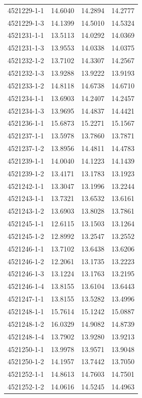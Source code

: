 \begin{longtable}{lrrr}
4521229-1-1 & 14.6040 & 14.2894 & 14.2777 \\
4521229-1-3 & 14.1399 & 14.5010 & 14.5324 \\
4521231-1-1 & 13.5113 & 14.0292 & 14.0369 \\
4521231-1-3 & 13.9553 & 14.0338 & 14.0375 \\
4521232-1-2 & 13.7102 & 14.3307 & 14.2567 \\
4521232-1-3 & 13.9288 & 13.9222 & 13.9193 \\
4521233-1-2 & 14.8118 & 14.6738 & 14.6710 \\
4521234-1-1 & 13.6903 & 14.2407 & 14.2457 \\
4521234-1-3 & 13.9695 & 14.4837 & 14.4421 \\
4521236-1-1 & 15.6873 & 15.2271 & 15.1567 \\
4521237-1-1 & 13.5978 & 13.7860 & 13.7871 \\
4521237-1-2 & 13.8956 & 14.4811 & 14.4783 \\
4521239-1-1 & 14.0040 & 14.1223 & 14.1439 \\
4521239-1-2 & 13.4171 & 13.1783 & 13.1923 \\
4521242-1-1 & 13.3047 & 13.1996 & 13.2244 \\
4521243-1-1 & 13.7321 & 13.6532 & 13.6161 \\
4521243-1-2 & 13.6903 & 13.8028 & 13.7861 \\
4521245-1-1 & 12.6115 & 13.1503 & 13.1264 \\
4521245-1-2 & 12.8992 & 13.2547 & 13.2552 \\
4521246-1-1 & 13.7102 & 13.6438 & 13.6206 \\
4521246-1-2 & 12.2061 & 13.1735 & 13.2223 \\
4521246-1-3 & 13.1224 & 13.1763 & 13.2195 \\
4521246-1-4 & 13.8155 & 13.6104 & 13.6443 \\
4521247-1-1 & 13.8155 & 13.5282 & 13.4996 \\
4521248-1-1 & 15.7614 & 15.1242 & 15.0887 \\
4521248-1-2 & 16.0329 & 14.9082 & 14.8739 \\
4521248-1-4 & 13.7902 & 13.9280 & 13.9213 \\
4521250-1-1 & 13.9978 & 13.9571 & 13.9048 \\
4521250-1-2 & 14.1957 & 13.7442 & 13.7050 \\
4521252-1-1 & 14.8613 & 14.7603 & 14.7501 \\
4521252-1-2 & 14.0616 & 14.5245 & 14.4963 \\

\end{longtable}
